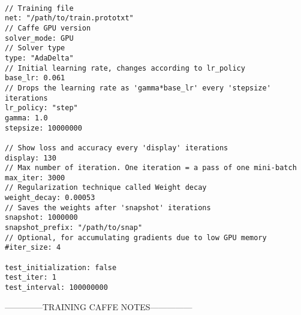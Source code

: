 \begin{lstlisting}

// Training file
net: "/path/to/train.prototxt"	
// Caffe GPU version
solver_mode: GPU
// Solver type		
type: "AdaDelta"
// Initial learning rate, changes according to lr_policy		
base_lr: 0.061		
// Drops the learning rate as 'gamma*base_lr' every 'stepsize' iterations
lr_policy: "step"		 	
gamma: 1.0
stepsize: 10000000

// Show loss and accuracy every 'display' iterations
display: 130
// Max number of iteration. One iteration = a pass of one mini-batch			
max_iter: 3000	
// Regularization technique called Weight decay		
weight_decay: 0.00053	
// Saves the weights after 'snapshot' iterations
snapshot: 1000000		
snapshot_prefix: "/path/to/snap" 
// Optional, for accumulating gradients due to low GPU memory 
#iter_size: 4			
  		
test_initialization: false	
test_iter: 1
test_interval: 100000000

\end{lstlisting}

	

\newpage
--------------TRAINING CAFFE NOTES---------------

